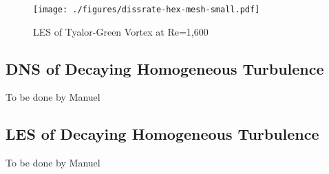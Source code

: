 \begin{figure}
\centering
\texttt{[image: ./figures/dissrate-hex-mesh-small.pdf]} \\
\caption{LES of Tyalor-Green Vortex at Re=1,600\cite{bull2013a}}
\label{fig:setup}
\end{figure}


\subsection{DNS of Decaying Homogeneous Turbulence}
To be done by Manuel
\subsection{LES of Decaying Homogeneous Turbulence}
To be done by Manuel

